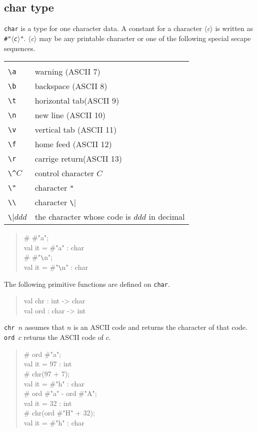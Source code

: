\documentclass{jbook}
\newcommand{\nonterm}[1]{\mbox{$\langle$}{\it #1}\mbox{$\rangle$}}
\newenvironment{program}{\begin{quote}\begin{tt}}%
                        {\end{tt}\end{quote}}
\begin{document}
\subsection{char type}
	{\tt char} is a type for one character data.
	A constant for a character \nonterm{c} is written as {\tt \#"\nonterm{c}"}.
	\nonterm{c} may be any printable character or one of the
following special secape sequences.
\begin{center}
\begin{tabular}{|l|l|}
\hline\\
\verb|\a| & {warning (ASCII 7)}\\
\verb|\b| & {backspace (ASCII 8)}\\
\verb|\t| & {horizontal tab(ASCII 9)}\\
\verb|\n| & {new line (ASCII 10)}\\
\verb|\v| & {vertical tab (ASCII 11)}\\
\verb|\f| & {home feed (ASCII 12)}\\
\verb|\r| & {carrige return(ASCII 13)}\\
\verb|\^|$C$ & {control character $C$}\\
\verb|\"| & {character {\tt \verb|"|}}\\ %
\verb|\\| & {character \verb|\|}\\
\verb|\|$ddd$ &  {the character whose code is $ddd$ in decimal}
\\\hline
\end{tabular}
\end{center}
\begin{program}
\# \#"a";\\
val it = \#"a" : char\\
\# \#"\verb|\|n";\\
val it = \#"\verb|\|n" : char
\end{program}
	The following primitive functions are defined on {\tt char}.
\begin{program}
val chr : int -> char\\
val ord : char -> int
\end{program}
	{\tt chr $n$} assumes that $n$ is an ASCII code and returns the
character of that code.
	{\tt ord $c$} returns the ASCII code of $c$.
\begin{program}
\# ord \#"a";\\
val it = 97 : int\\
\# chr(97 + 7);\\
val it = \#"h" : char\\
\# ord \#"a" - ord \#"A";\\
val it = 32 : int\\
\# chr(ord \#"H" + 32);\\
val it = \#"h" : char
\end{program}
\end{document}

